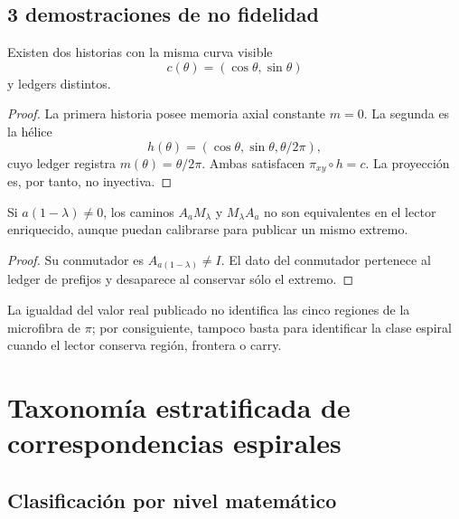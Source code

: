 \section{3 demostraciones de no fidelidad}

\begin{proposition}
Existen dos historias con la misma curva visible
\[
 c(\theta)=(\cos\theta,\sin\theta)
\]
y ledgers distintos.
\end{proposition}
\begin{proof}
La primera historia posee memoria axial constante \(m=0\). La segunda es
la hélice
\[
 h(\theta)=(\cos\theta,\sin\theta,\theta/2\pi),
\]
cuyo ledger registra \(m(\theta)=\theta/2\pi\). Ambas satisfacen
\(\pi_{xy}\circ h=c\). La proyección es, por tanto, no inyectiva.
\end{proof}

\begin{proposition}
Si \(a(1-\lambda)\neq0\), los caminos \(A_aM_\lambda\) y
\(M_\lambda A_a\) no son equivalentes en el lector enriquecido, aunque
puedan calibrarse para publicar un mismo extremo.
\end{proposition}
\begin{proof}
Su conmutador es \(A_{a(1-\lambda)}\neq I\). El dato del conmutador
pertenece al ledger de prefijos y desaparece al conservar sólo el extremo.
\end{proof}

\begin{proposition}
La igualdad del valor real publicado no identifica las cinco regiones de
la microfibra de \(\pi\); por consiguiente, tampoco basta para identificar
la clase espiral cuando el lector conserva región, frontera o carry.
\end{proposition}

\chapter{Taxonomía estratificada de correspondencias espirales}

\section{Clasificación por nivel matemático}

